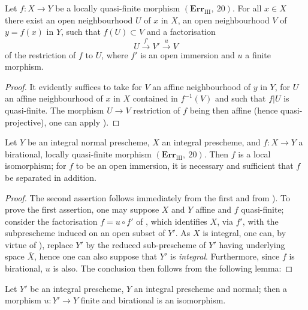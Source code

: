 
\begin{corollary}[8.12.9]
\label{IV.8.12.9}
Let $f:X\to Y$ be a locally quasi-finite morphism $(\mathbf{Err}_{\text{III}},~20)$.
For all $x\in X$ there exist an open neighbourhood $U$ of $x$ in $X$, an open neighbourhood $V$ of $y=f(x)$ in $Y$, such that $f(U)\subset V$ and a factorisation
\[
U\xrightarrow{f'}V'\xrightarrow{u}V
\]
of the restriction of $f$ to $U$, where $f'$ is an open immersion and $u$ a finite morphism.
\end{corollary}

\begin{proof}
It evidently suffices to take for $V$ an affine neighbourhood of $y$ in $Y$, for $U$ an affine neighbourhood of $x$ in $X$ contained in $f^{-1}(V)$ and such that $f|U$ is quasi-finite.
The morphism $U\to V$ restriction of $f$ being then affine (hence quasi-projective), one can apply ).
\end{proof}

\begin{corollary}[8.12.10]
\label{IV.8.12.10}
Let $Y$ be an integral normal prescheme, $X$ an integral prescheme, and $f:X\to Y$ a birational, locally quasi-finite morphism $(\mathbf{Err}_{\text{III}},~20)$.
Then $f$ is a local isomorphism; for $f$ to be an open immersion, it is necessary and sufficient that $f$ be separated in addition.
\end{corollary}

\begin{proof}
The second assertion follows immediately from the first and from ).
To prove the first assertion, one may suppose $X$ and $Y$ affine and $f$ quasi-finite; consider the factorisation $f=u\circ f'$ of , which identifies $X$, via $f'$, with the subprescheme induced on an open subset of $Y'$.
As $X$ is integral, one can, by virtue of ), replace $Y'$ by the reduced sub-prescheme of $Y'$ having underlying space $\overline{X}$, hence one can also suppose that $Y'$ is \emph{integral}.
Furthermore, since $f$ is birational, $u$ is also.
The conclusion then follows from the following lemma:
\end{proof}

\begin{lemma}[8.12.10.1]
\label{IV.8.12.10.1}
Let $Y'$ be an integral prescheme, $Y$ an integral prescheme and normal; then a morphism $u:Y'\to Y$ finite and birational is an isomorphism.
\end{lemma}

